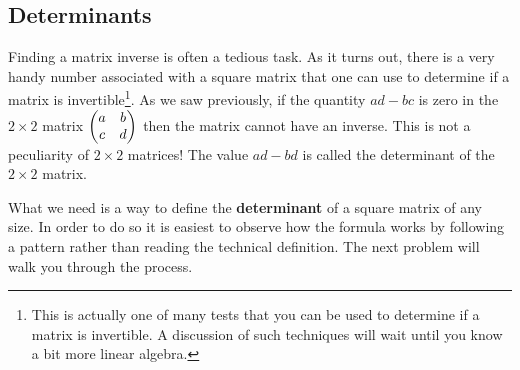 \subsection{Determinants}
Finding a matrix inverse is often a tedious task.  As it turns out, there is a
very handy number associated with a square matrix that one can use to determine if a
matrix is invertible\footnote{This is actually one of many tests that you can be used to
determine if a matrix is invertible. A discussion of such techniques will wait until you
know a bit more linear algebra.}.  As we saw previously, if the
quantity $ad-bc$ is zero in the $2 \times 2$ matrix $\begin{pmatrix} a & b \\ c & d \end{pmatrix}$ then the
matrix cannot have an inverse.  This is not a peculiarity of $2 \times 2$ matrices!  The
value $ad-bd$ is called the determinant of the $2 \times 2$ matrix.  

What we need is a way to define the {\bf determinant} of a square matrix of any size.  In
order to do so it is easiest to observe how the formula works by following a pattern rather
than reading the technical definition.  The next problem will walk you through the
process.

